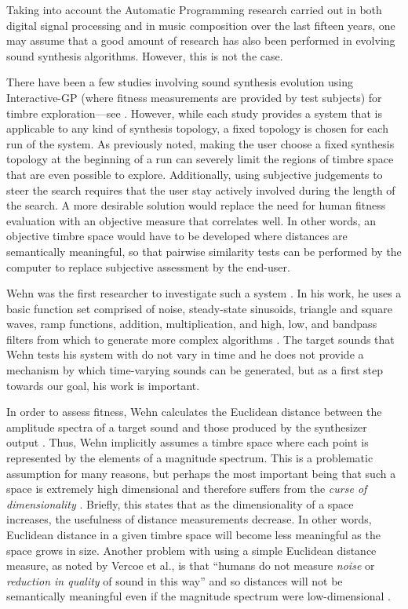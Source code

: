 \documentclass[a4paper,12pt]{report} 	%
\numberwithin{figure}{chapter}
\numberwithin{table}{chapter}
\numberwithin{equation}{chapter}
\begin{document}
\begin{flushleft}
Taking into account the Automatic Programming research carried out in both digital signal processing and in music composition over the last fifteen years, one may assume that a good amount of research has also been performed in evolving sound synthesis algorithms. However, this is not the case.

There have been a few studies involving sound synthesis evolution using Interactive-GP (where fitness measurements are provided by test subjects) for timbre exploration---see \cite{Dahlstedt:2001dd, Mandelis:2005iw, McDermott:2006gd}. However, while each study provides a system that is applicable to any kind of synthesis topology, a fixed topology is chosen for each run of the system. As previously noted, making the user choose a fixed synthesis topology at the beginning of a run can severely limit the regions of timbre space that are even possible to explore. Additionally, using subjective judgements to steer the search requires that the user stay actively involved during the length of the search. A more desirable solution would replace the need for human fitness evaluation with an objective measure that correlates well. In other words, an objective timbre space would have to be developed where distances are semantically meaningful, so that pairwise similarity tests can be performed by the computer to replace subjective assessment by the end-user.

Wehn was the first researcher to investigate such a system \cite{Wehn:1998bh}. In his work, he uses a basic function set comprised of noise, steady-state sinusoids, triangle and square waves, ramp functions, addition, multiplication, and high, low, and bandpass filters from which to generate more complex algorithms \cite[p. 2]{Wehn:1998bh}. The target sounds that Wehn tests his system with do not vary in time and he does not provide a mechanism by which time-varying sounds can be generated, but as a first step towards our goal, his work is important.

In order to assess fitness, Wehn calculates the Euclidean distance between the amplitude spectra of a target sound and those produced by the synthesizer output \cite[p. 2]{Wehn:1998bh}. Thus, Wehn implicitly assumes a timbre space where each point is represented by the elements of a magnitude spectrum. This is a problematic assumption for many reasons, but perhaps the most important being that such a space is extremely high dimensional and therefore suffers from the \emph{curse of dimensionality} \cite{Powell:NoRead}. Briefly, this states that as the dimensionality of a space increases, the usefulness of distance measurements decrease. In other words, Euclidean distance in a given timbre space will become less meaningful as the space grows in size. Another problem with using a simple Euclidean distance measure, as noted by Vercoe et al., is that ``humans do not measure \emph{noise} or \emph{reduction in quality} of sound in this way'' and so distances will not be semantically meaningful even if the magnitude spectrum were low-dimensional \cite[p. 2]{Vercoe:1998hh}.


\end{flushleft}
\end{document}

